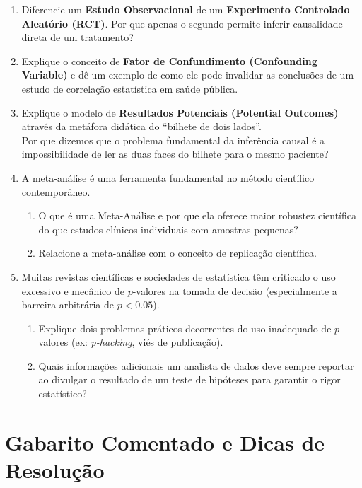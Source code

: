 \documentclass[12pt]{article}
\begin{document}
\begin{enumerate}[label=\textbf{Questão \arabic*}, resume]
    \item Diferencie um \textbf{Estudo Observacional} de um \textbf{Experimento Controlado Aleatório (RCT)}. Por que apenas o segundo permite inferir causalidade direta de um tratamento?

    \item Explique o conceito de \textbf{Fator de Confundimento (Confounding Variable)} e dê um exemplo de como ele pode invalidar as conclusões de um estudo de correlação estatística em saúde pública.

    \item Explique o modelo de \textbf{Resultados Potenciais (Potential Outcomes)} através da metáfora didática do ``bilhete de dois lados''. \\
    Por que dizemos que o problema fundamental da inferência causal é a impossibilidade de ler as duas faces do bilhete para o mesmo paciente?

    \item A meta-análise é uma ferramenta fundamental no método científico contemporâneo.
    \begin{enumerate}[label=\alph*)]
        \item O que é uma Meta-Análise e por que ela oferece maior robustez científica do que estudos clínicos individuais com amostras pequenas?
        \item Relacione a meta-análise com o conceito de replicação científica.
    \end{enumerate}

    \item Muitas revistas científicas e sociedades de estatística têm criticado o uso excessivo e mecânico de $p$-valores na tomada de decisão (especialmente a barreira arbitrária de $p < 0.05$).
    \begin{enumerate}[label=\alph*)]
        \item Explique dois problemas práticos decorrentes do uso inadequado de $p$-valores (ex: \textit{p-hacking}, viés de publicação).
        \item Quais informações adicionais um analista de dados deve sempre reportar ao divulgar o resultado de um teste de hipóteses para garantir o rigor estatístico?
    \end{enumerate}
\end{enumerate}

\pagebreak

\section*{Gabarito Comentado e Dicas de Resolução}
\end{document}
